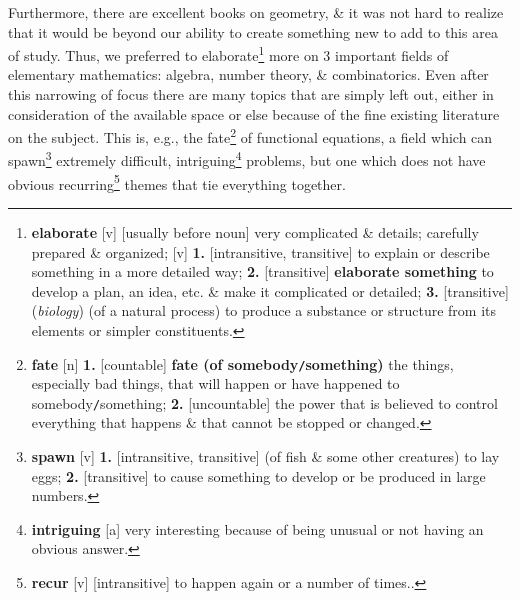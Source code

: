 \documentclass[oneside]{book}
\numberwithin{equation}{section}
\begin{document}
Furthermore, there are excellent books on geometry, \& it was not hard to realize that it would be beyond our ability to create something new to add to this area of study. Thus, we preferred to elaborate\footnote{\textbf{elaborate} [v] [usually before noun] very complicated \& details; carefully prepared \& organized; [v] \textbf{1.} [intransitive, transitive] to explain or describe something in a more detailed way; \textbf{2.} [transitive] \textbf{elaborate something} to develop a plan, an idea, etc. \& make it complicated or detailed; \textbf{3.} [transitive] (\textit{biology}) (of a natural process) to produce a substance or structure from its elements or simpler constituents.} more on 3 important fields of elementary mathematics: algebra, number theory, \& combinatorics. Even after this narrowing of focus there are many topics that are simply left out, either in consideration of the available space or else because of the fine existing literature on the subject. This is, e.g., the fate\footnote{\textbf{fate} [n] \textbf{1.} [countable] \textbf{fate (of somebody\texttt{/}something)} the things, especially bad things, that will happen or have happened to somebody\texttt{/}something; \textbf{2.} [uncountable] the power that is believed to control everything that happens \& that cannot be stopped or changed.} of functional equations, a field which can spawn\footnote{\textbf{spawn} [v] \textbf{1.} [intransitive, transitive] (of fish \& some other creatures) to lay eggs; \textbf{2.} [transitive] to cause something to develop or be produced in large numbers.} extremely difficult, intriguing\footnote{\textbf{intriguing} [a] very interesting because of being unusual or not having an obvious answer.} problems, but one which does not have obvious recurring\footnote{\textbf{recur} [v] [intransitive] to happen again or a number of times..} themes that tie everything together.
\end{document}
